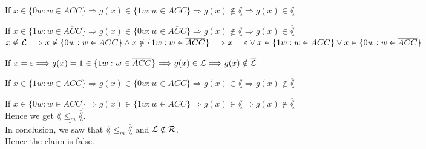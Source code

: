 If $x \in \{0w: w \in ACC\}
    \Longrightarrow g(x) \in \{1w: w \in ACC\}
    \Longrightarrow g(x) \notin \lang
    \Longrightarrow g(x) \in \overline{\lang}$

If $x \in \{1w: w \in \overline{ACC}\}
    \Longrightarrow g(x) \in \{0w: w \in \overline{ACC}\}
    \Longrightarrow g(x) \notin \lang
    \Longrightarrow g(x) \in \overline{\lang}$ \\

$x \notin \mathcal{L} \\
    \Longrightarrow x \notin \{0w: w \in ACC\} \wedge x \notin \{1w: w \in \overline{ACC}\} \\
    \Longrightarrow x = \varepsilon \vee x \in \{1w: w \in ACC\} \vee x \in \{0w: w \in \overline{ACC}\}$

If $x = \varepsilon
    \Longrightarrow g(x) = 1 \in \{1w: w \in \overline{ACC}\}
    \Longrightarrow g(x) \in \mathcal{L}
    \Longrightarrow g(x) \notin \overline{\mathcal{L}}$

If $x \in \{1w: w \in ACC\}
    \Longrightarrow g(x) \in \{0w: w \in ACC\}
    \Longrightarrow g(x) \in \lang
    \Longrightarrow g(x) \notin \overline{\lang}$

If $x \in \{0w: w \in \overline{ACC}\}
    \Longrightarrow g(x) \in \{1w: w \in \overline{ACC}\}
    \Longrightarrow g(x) \in \lang
    \Longrightarrow g(x) \notin \overline{\lang}$ \\

Hence we get $\underline{\lang \leq_m \overline{\lang}}$. \\

In conclusion, we saw that $\lang \leq_m \overline{\lang}$ and $\mathcal{L} \notin \mathcal{R}$. \\
Hence the claim is false.